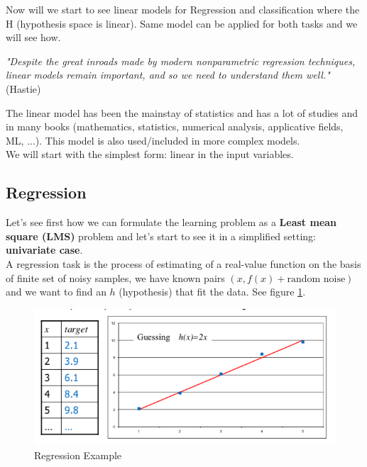 \documentclass[../main.tex]{subfiles}
\begin{document}
Now will we start to see linear models for Regression and classification where the H (hypothesis space is linear). Same model can be applied for both tasks and we will see how.\\

\begin{flushright}
\textit{"Despite the great inroads made by modern nonparametric regression techniques, linear models remain important, and so we need to understand them well."} (Hastie)\\
\end{flushright}

The linear model has been the mainstay of statistics and has a lot of studies and in many books (mathematics, statistics, numerical analysis, applicative fields, ML, ...). This model is also used/included in more complex models.\\

We will start with the simplest form: linear in the input variables.

\subsection{Regression}
Let's see first how we can formulate the learning problem as a \textbf{Least mean square (LMS)} problem and let's start to see it in a simplified setting: \textbf{univariate case}.\\

A regression task is the process of estimating of a real-value function on the basis of finite set of noisy samples, we have known pairs $(x, f(x) + \text{random noise})$ and we want to find an $h$ (hypothesis) that fit the data. See figure \ref{fig:linear_model_regression_exp}.
\begin{figure}
    \centering
    \includegraphics[scale = 0.4]{lectures/2_linear_model/regression_exp.png}
    \caption{Regression Example}
    \label{fig:linear_model_regression_exp}
\end{figure}
\end{document}
